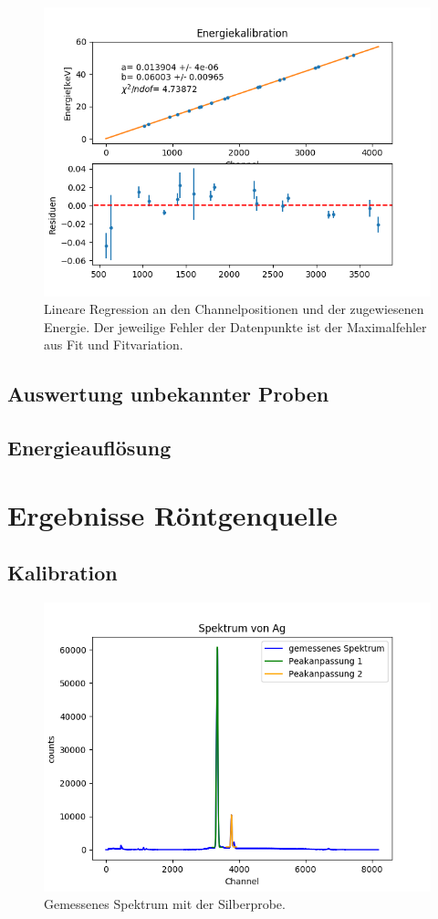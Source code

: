 \documentclass[12pt,a4paper]{article}
\begin{document}
\begin{figure}
\centering
\includegraphics[scale=0.8]{Bilder/alpha/kal.png}
\caption{Lineare Regression an den Channelpositionen und der zugewiesenen Energie. Der jeweilige Fehler der Datenpunkte ist der Maximalfehler aus Fit und Fitvariation.}
\label{fig:kal_linreg}
\end{figure}

\subsection{Auswertung unbekannter Proben}
\subsection{Energieauflösung}

\section{Ergebnisse Röntgenquelle}
\subsection{Kalibration}
\begin{figure}
\centering
\includegraphics[scale=0.8]{Bilder/roentgen/Kalibration/Ag_gesamt.png}
\caption{Gemessenes Spektrum mit der Silberprobe.}
\label{fig:röntgen_AgSpektrum}
\end{figure}
\end{document}
